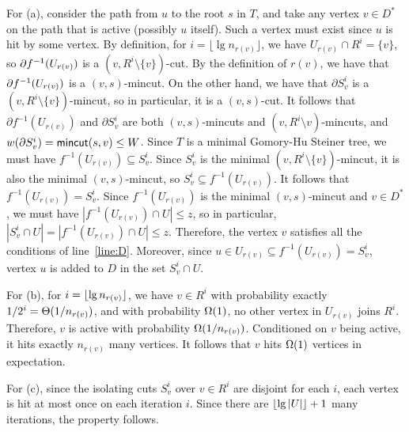 For (a), consider the path from $u$ to the root $s$ in $T$, and take any vertex $v\in D^*$ on the path that is active (possibly $u$ itself). Such a vertex must exist since $u$ is hit by some vertex. By definition, for $i=\lfloor\lg n_{r(v)}\rfloor$, we have $U_{r(v)}\cap R^i=\{v\}$, so $\partial f^{-1}(U_{r(v)})$ is a $(v,R^i\setminus \{v\})$-cut.  By the definition of $r(v)$, we have that $\partial f^{-1}(U_{r(v)})$ is a $(v,s)$-mincut. On the other hand, we have that $\partial S^i_v$ is a $(v,R^i\setminus\{v\})$-mincut, so in particular, it is a $(v,s)$-cut. It follows that $\partial f^{-1}(U_{r(v)})$ and $\partial S^i_v$ are both $(v,s)$-mincuts and $(v,R^i\setminus v)$-mincuts, and $w(\partial S^i_v)=\textsf{\textup{mincut}}(s,v)\le W$. Since $T$ is a minimal Gomory-Hu Steiner tree, we must have $f^{-1}(U_{r(v)}) \subseteq S^i_v$. Since $S^i_v$ is the minimal $(v,R^i\setminus\{v\})$-mincut, it is also the minimal $(v,s)$-mincut, so $S^i_v\subseteq f^{-1}(U_{r(v)}) $. It follows that $f^{-1}(U_{r(v)})=S^i_v$. Since $f^{-1}(U_{r(v)})$ is the minimal $(v,s)$-mincut and $v\in D^*$, we must have $|f^{-1}(U_{r(v)})\cap U|\le z$, so in particular, $|S^i_v\cap U|=|f^{-1}(U_{r(v)})\cap U|\le z$. Therefore, the vertex $v$ satisfies all the conditions of line~\ref{line:D}. Moreover, since $u\in U_{r(v)}\subseteq f^{-1}(U_{r(v)})= S^i_v$, vertex $u$ is added to $D$ in the set $S^i_v\cap U$. 

For (b), for $i=\lfloor\lg n_{r(v)}\rfloor$, we have $v\in R^i$ with probability exactly $1/2^i = \Theta(1/n_{r(v)})$, and with probability $\Omega(1)$, no other vertex in $U_{r(v)}$ joins $R^i$. Therefore, $v$ is active with probability $\Omega(1/n_{r(v)})$. Conditioned on $v$ being active, it hits exactly $n_{r(v)}$ many vertices. It follows that $v$ hits $\Omega(1)$ vertices in expectation.

For (c), since the isolating cuts $S^i_v$ over $v\in R^i$ are disjoint for each $i$, each vertex is hit at most once on each iteration $i$. Since there are $\lfloor\lg|U|\rfloor+1$ many iterations, the property follows. %


